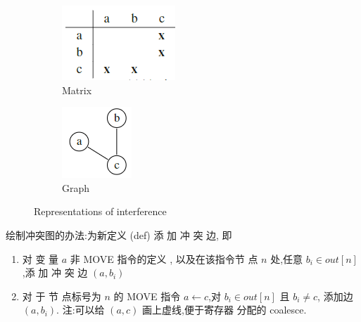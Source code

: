 \begin{figure}[!htb]
    \centering
    \begin{subfigure}{0.12\textwidth}
        \centering
        \includegraphics[width=\textwidth]{pic/CP10/Matrix.png}
        \caption{Matrix}
    \end{subfigure}
    \begin{subfigure}{0.08\textwidth}
        \centering
        \includegraphics[width=\textwidth]{pic/CP10/Graph.png}
        \caption{Graph}
    \end{subfigure}
    \caption{Representations of interference}
\end{figure}

绘制冲突图的办法:为新定义 (def) 添 加 冲 突 边, 即
\begin{enumerate}
    \item 对 变 量 $a$ 非 MOVE 指令的定义 , 以及在该指令节 点 $n$ 处,任意 $b_i\in out[n]$,添 加 冲 突 边 $(a,b_i)$
    \item 对 于 节 点标号为 $n$ 的 MOVE 指令 $a\leftarrow c$,对 $b_i\in out[n]$ 且 $b_i\ne c$, 添加边 $(a,b_i)$. 
    \subitem 注:可以给 $(a,c)$ 画上虚线,便于寄存器 分配的 coalesce.
\end{enumerate}


